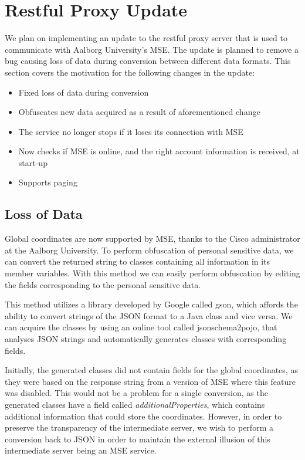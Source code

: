 \section{Restful Proxy Update}\label{sec:proxy_update1}
We plan on implementing an update to the restful proxy server that is used to communicate with Aalborg University's MSE. The update is planned to remove a bug causing loss of data during conversion between different data formats. This section covers the motivation for the following changes in the update:

\begin{itemize}
\item Fixed loss of data during conversion
\item Obfuscates new data acquired as a result of aforementioned change
\item The service no longer stops if it loses its connection with MSE
\item Now checks if MSE is online, and the right account information is received, at start-up
\item Supports paging
\end{itemize}

\subsection{Loss of Data}
Global coordinates are now supported by MSE, thanks to the Cisco administrator at the Aalborg University. To perform obfuscation of personal sensitive data, we can convert the returned string to classes containing all information in its member variables. With this method we can easily perform obfuscation by editing the fields corresponding to the personal sensitive data.

This method utilizes a library developed by Google called gson\cite{gson}, which affords the ability to convert strings of the JSON format to a Java class and vice versa. We can acquire the classes by using an online tool called jsonschema2pojo\cite{jsonschematwopojo}, that analyses JSON strings and automatically generates classes with corresponding fields.

Initially, the generated classes did not contain fields for the global coordinates, as they were based on the response string from a version of MSE where this feature was disabled. This would not be a problem for a single conversion, as the generated classes have a field called \textit{additionalProperties}, which contains additional information that could store the coordinates. However, in order to preserve the transparency of the intermediate server, we wish to perform a conversion back to JSON in order to maintain the external illusion of this intermediate server being an MSE service.

